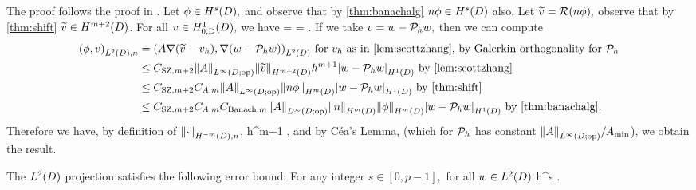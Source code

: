 The proof follows the proof in \cite[Theorem 5.8.3]{BrSc:08}. Let $\phi \in \HsD,$ and observe that by \cref{thm:banachalg} $n\phi\in \HsD$ also. Let $ \widetilde{v} = \mathcal R(n\phi),$ observe that by \cref{thm:shift} $\vtilde \in \Hfn{}{m+2}{D}$. For all $v \in \HozDD,$ we have
\beqs
{} =  = .
\eeqs
If we take $v = w-\mathcal P_{h} w,$ then we can compute
\begin{align*}
\IPLtDn{\phi}{v} &= \IPLtD{A\grad\mleft(\vtilde - \vh\mright)}{\grad\mleft(w-\Ph w\mright)} \text{ for } \vh \text{ as in \cref{lem:scottzhang}, by Galerkin orthogonality for } \Ph\\
&\leq \CSZfn{m+2}\NLiDop{A} \NHfn{m+2}{D}{\vtilde} h^{m+1} \SNHoD{w-\Ph w} \text{ by \cref{lem:scottzhang}}\\
&\leq \CSZfn{m+2} \CAfn{m} \NLiDop{A} \NHfn{m}{D}{n\phi} \SNHoD{w-\Ph w}\text{ by \cref{thm:shift}}\\
&\leq \CSZfn{m+2} \CAfn{m} \CBanfn{m} \NLiDop{A} \NHfn{m}{D}{n}\NHfn{m}{D}{\phi} \SNHoD{w-\Ph w}\text{ by \cref{thm:banachalg}}.
\end{align*}
Therefore we have, by definition of $\NHnfn{-m}{D}{\cdot}$,
\beqs
{} \leq {}    h^{m+1} ,
\eeqs
and by C\'ea's Lemma, (which for $\mathcal P_{h}$ has constant $\NLiDop{A}/\Amin$), we obtain the result.
\epf


The $\LtD$ projection satisfies the following error bound:
\label{lem:ltdprojerr}
For any integer $s \in [0,p-1],$ for all $w \in \LtD$
\beqs
{} \leq \Cmsz h^{s} .
\eeqs
\ele



